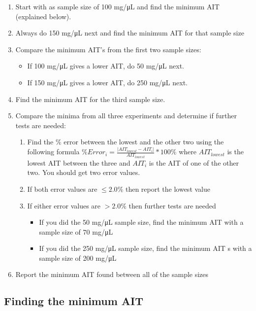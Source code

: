 \begin{enumerate}
\def\labelenumi{\arabic{enumi}.}
\item
  Start with as sample size of 100 mg/μL and find the minimum AIT
  (explained below).
\item
  Always do 150 mg/μL next and find the minimum AIT for that sample size
\item
  Compare the minimum AIT's from the first two sample sizes:

  \begin{itemize}
  \item
    If 100 mg/μL gives a lower AIT, do 50 mg/μL next.
  \item
    If 150 mg/μL gives a lower AIT, do 250 mg/μL next.
  \end{itemize}
\item
  Find the minimum AIT for the third sample size.
\item
  Compare the minima from all three experiments and determine if further
  tests are needed:

  \begin{enumerate}
  \def\labelenumii{\arabic{enumii}.}
  \item
    Find the \% error between the lowest and the other two using the
    following formula
    \(\%Error_i = \frac{|AIT_{lowest} - AIT_{i}|}{AIT_{lowest}} * 100 \%\)
    where \(AIT_{lowest}\) is the lowest AIT between the three and
    \(AIT_i\) is the AIT of one of the other two. You should get two
    error values.
  \item
    If both error values are \(\leq 2.0\%\) then report the lowest value
  \item
    If either error values are \(> 2.0\%\) then further tests are needed

    \begin{itemize}
    \item
      If you did the 50 mg/μL sample size, find the minimum AIT with a
      sample size of 70 mg/μL
    \item
      If you did the 250 mg/μL sample size, find the minimum AIT s with
      a sample size of 200 mg/μL
    \end{itemize}
  \end{enumerate}
\item
  Report the minimum AIT found between all of the sample sizes
\end{enumerate}

\hypertarget{finding-the-minimum-ait}{%
\subsection{Finding the minimum AIT}\label{finding-the-minimum-ait}}

